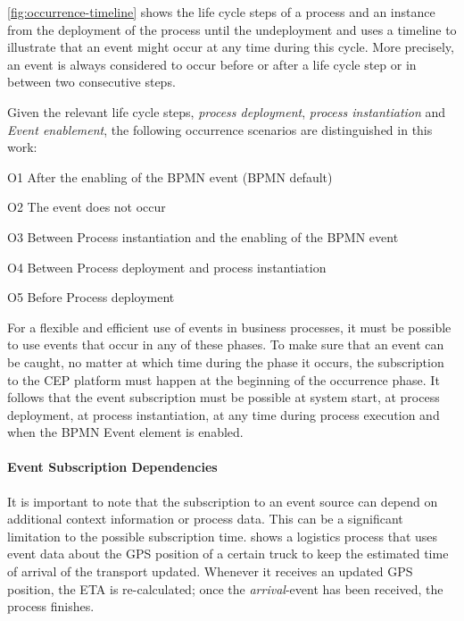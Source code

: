 \autoref{fig:occurrence-timeline} shows the life cycle steps of a process and an instance from the deployment of the process until the undeployment and uses a timeline to illustrate that an event might occur at any time during this cycle. More precisely, an event is always considered to occur before or after a life cycle step or in between two consecutive steps.

Given the relevant life cycle steps, \textit{process deployment}, \textit{process instantiation} and \textit{Event enablement}, the following occurrence scenarios are distinguished in this work:
\begin{aenumerate}
	\item O1 After the enabling of the BPMN event (BPMN default)
	\item O2 The event does not occur
	\item O3 Between Process instantiation and the enabling of the BPMN event
	\item O4 Between Process deployment and process instantiation
	\item O5 Before Process deployment
\end{aenumerate}\label{def:occurrence-times}


For a flexible and efficient use of events in business processes, it must be possible to use events that occur in any of these phases.
To make sure that an event can be caught, no matter at which time during the phase it occurs, the subscription to the CEP platform must happen at the beginning of the occurrence phase.
It follows that the event subscription must be possible at system start, at process deployment, at process instantiation, at any time during process execution and when the BPMN Event element is enabled.


\paragraph{Event Subscription Dependencies}
It is important to note that the subscription to an event source can depend on additional context information or process data. This can be a significant limitation to the possible subscription time.
 shows a logistics process that uses event data about the GPS position of a certain truck to keep the estimated time of arrival of the transport updated. Whenever it receives an updated GPS position, the ETA is re-calculated; once the \textit{arrival}-event has been received, the process finishes.

